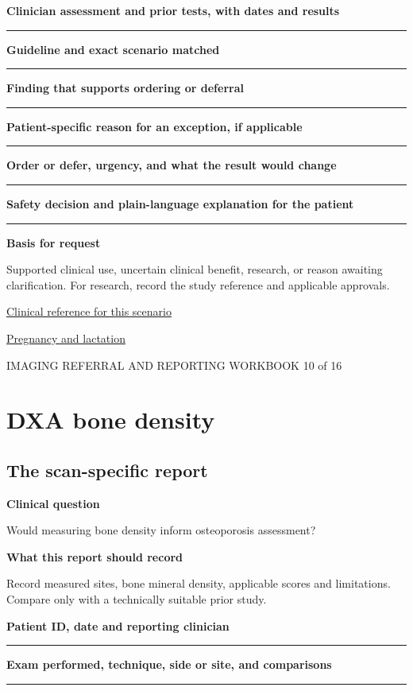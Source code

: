 \documentclass[11pt,a4paper]{article}
\newcommand{\record}[1]{\textbf{#1}\par\vspace{0.55\baselineskip}\hrule\vspace{0.35\baselineskip}}
\begin{document}
\record{Clinician assessment and prior tests, with dates and results}

\record{Guideline and exact scenario matched}

\record{Finding that supports ordering or deferral}

\record{Patient-specific reason for an exception, if applicable}

\record{Order or defer, urgency, and what the result would change}

\record{Safety decision and plain-language explanation for the patient}

\textbf{Basis for request}\par Supported clinical use, uncertain clinical benefit, research, or reason awaiting clarification. For research, record the study reference and applicable approvals.\par

\small\href{https://www.uspreventiveservicestaskforce.org/uspstf/recommendation/osteoporosis-screening}{Clinical reference for this scenario}

\quad\href{https://pubmed.ncbi.nlm.nih.gov/28937575/}{Pregnancy and lactation}

\normalsize

\newpage

{\small IMAGING REFERRAL AND REPORTING WORKBOOK \hfill 10 of 16}

\section*{DXA bone density}

\subsection*{The scan-specific report}

\textbf{Clinical question}\par Would measuring bone density inform osteoporosis assessment?\par

\textbf{What this report should record}\par Record measured sites, bone mineral density, applicable scores and limitations. Compare only with a technically suitable prior study.\par

\record{Patient ID, date and reporting clinician}

\record{Exam performed, technique, side or site, and comparisons}
\end{document}
